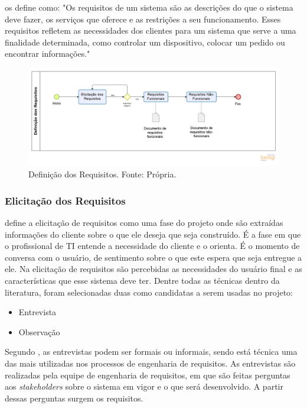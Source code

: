  os define como: "Os requisitos de um sistema são as descrições do que o sistema deve fazer, os serviços que oferece e as restrições a seu funcionamento. Esses requisitos refletem as necessidades dos clientes para um sistema que serve a uma finalidade determinada, como controlar um dispositivo, colocar um pedido ou encontrar informações."

\begin{figure}[H]
	\centering
	\includegraphics[width=1.0\textwidth]{figuras/elicitacaoDosRequisitos.png}
	\caption{Definição dos Requisitos. Fonte: Própria.}
	\label{img:definicao_requisitos}
\end{figure}

\subsubsection{Elicitação dos Requisitos}
\label{sec:elicitacao_requisitos}

 define a elicitação de requisitos como uma fase do projeto onde são extraídas informações do cliente sobre o que ele deseja que seja construído. É a fase em que o profissional de TI entende a necessidade do cliente e o orienta. É o momento de conversa com o usuário, de sentimento sobre o que este espera que seja entregue a ele. Na elicitação de requisitos são percebidas as necessidades do usuário final e as características que esse sistema deve ter. Dentre todas as técnicas dentro da literatura, foram selecionadas duas como candidatas a serem usadas no projeto:

\begin{itemize}
    \item Entrevista
    \item Observação
\end{itemize}

\label{sec:entrevista}

Segundo , as entrevistas podem ser formais ou informais, sendo está técnica uma das mais utilizadas nos processos de engenharia de requisitos. 
As entrevistas são realizadas pela equipe de engenharia de requisitos, em que são feitas perguntas aos \textit{stakeholders} sobre o sistema em vigor e o que será desenvolvido. A partir dessas perguntas surgem os requisitos.

